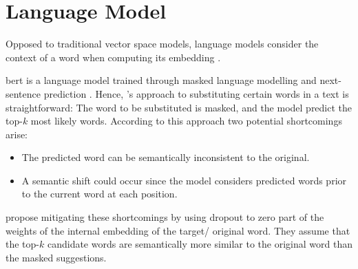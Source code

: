 \section{Language Model}
\label{sec:language_model}

Opposed to traditional vector space models, language models consider the context of a word when computing its embedding \cite{emmery_adversarial_2021}.


\ac{bert} is a language model trained through masked language modelling and next-sentence prediction \cite{emmery_adversarial_2021}.
Hence, \citet{emmery_adversarial_2021}'s approach to substituting certain words in a text is straightforward:
The word to be substituted is masked, and the model predict the top-$k$ most likely words.
According to this approach two potential shortcomings arise:
\begin{itemize}
    \item The predicted word can be semantically inconsistent to the original.
    \item A semantic shift could occur since the model considers predicted words prior to the current word at each position.
\end{itemize}
\citet{emmery_adversarial_2021} propose mitigating these shortcomings by using dropout to zero part of the weights of the internal embedding of the target/ original word.
They assume that the top-$k$ candidate words are semantically more similar to the original word than the masked suggestions.
